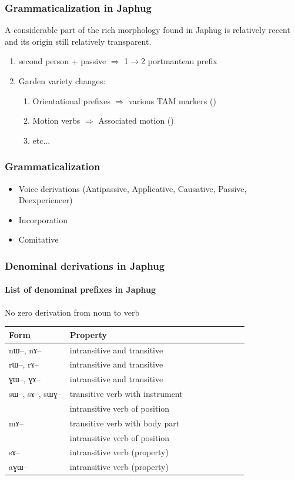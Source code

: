 \documentclass[xcolor=table]{beamer}
\newcommand{\ipa}[1]{{\phon \mbox{#1}}} %
\begin{document}
  \begin{frame} 
 \frametitle{Grammaticalization in Japhug} 

A considerable part of the rich morphology found in Japhug is relatively recent and its origin still relatively transparent.

 \begin{enumerate}[<+->]
   \item second person + passive $\Rightarrow$ 1$\rightarrow$2 portmanteau prefix
	\item Garden variety changes:
 \begin{enumerate}	
 \item Orientational prefixes $\Rightarrow$  various TAM markers (\citealt{jackson07irrealis, lin11direction, jacques14linking})
 \item Motion verbs $\Rightarrow$ Associated motion (\citealt{jacques13harmonization})
  \item etc...
  \end{enumerate}
 \end{enumerate}

  \end{frame}   

  \begin{frame} 
 \frametitle{Grammaticalization} 
 \begin{itemize}
\item Voice derivations (Antipassive, Applicative, Causative, Passive, Deexperiencer)
\item Incorporation
\item Comitative
\end{itemize}
\end{frame}   

  \begin{frame} 
 \frametitle{Denominal derivations in Japhug} 
  \framesubtitle{List of denominal prefixes in Japhug} 
 
No zero derivation from noun to verb 
 
\begin{tabular}{lllllllll} \toprule
Form& Property \\
\midrule
\ipa{nɯ}--, \ipa{nɤ}-- & intransitive and transitive \\
\ipa{rɯ}--, \ipa{rɤ}-- & intransitive and transitive \\
\ipa{ɣɯ}--, \ipa{ɣɤ}-- & intransitive and transitive \\
\ipa{sɯ}--, \ipa{sɤ}--, \ipa{sɯɣ}--  & transitive verb with instrument\\
&intransitive verb of position \\
\ipa{mɤ}-- & transitive verb with body part\\
& intransitive verb of position \\
\ipa{sɤ}-- & intransitive verb (property) \\
\ipa{aɣɯ}-- & intransitive verb (property) \\
    \bottomrule
\end{tabular}

\end{frame}   
\end{document}
